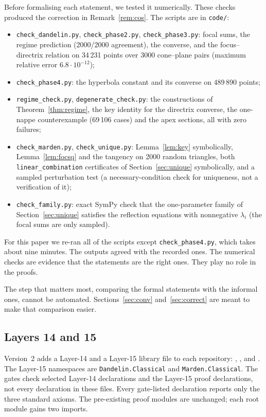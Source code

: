 \documentclass[11pt]{article}
\theoremstyle{remark}
\newcommand{\lean}[1]{\texttt{#1}}
\begin{document}
Before formalising each statement, we tested it numerically. These checks produced the correction in
Remark~\ref{rem:cos}. The scripts are in \texttt{code/}:
\begin{itemize}
\item \texttt{check\_dandelin.py}, \texttt{check\_phase2.py}, \texttt{check\_phase3.py}: focal sums,
the regime prediction (2000/2000 agreement), the converse, and the focus--directrix relation on 34\,231 points
over 3000 cone--plane pairs (maximum relative error $6.8\cdot10^{-12}$);
\item \texttt{check\_phase4.py}: the hyperbola constant and its converse on 489\,890 points;
\item \texttt{regime\_check.py}, \texttt{degenerate\_check.py}: the constructions of
Theorem~\ref{thm:regime}, the key identity for the directrix converse, the one-nappe counterexample
(69\,106 cases) and the apex sections, all with zero failures;
\item \texttt{check\_marden.py}, \texttt{check\_unique.py}: Lemma~\ref{lem:key} symbolically,
Lemma~\ref{lem:focsq} and the tangency on 2000 random triangles, both \lean{linear\_combination}
certificates of Section~\ref{sec:unique} symbolically, and a sampled perturbation test (a
necessary-condition check for uniqueness, not a verification of it);
\item \texttt{check\_family.py}: exact SymPy check that the one-parameter family of Section~\ref{sec:unique}
satisfies the reflection equations with nonnegative $\lambda_i$ (the focal sums are only sampled).
\end{itemize}
For this paper we re-ran all of the scripts except \texttt{check\_phase4.py}, which takes about nine minutes. The outputs agreed with the recorded
ones. The numerical checks are evidence that the statements are the right ones. They play no role in the proofs.

The step that matters most, comparing the formal statements with the informal ones, cannot be
automated. Sections~\ref{sec:conv} and~\ref{sec:correct} are meant to make that comparison easier.

\subsection{Layers 14 and 15}\label{sec:layers}
\begingroup\sloppy

Version~2 adds a Layer-14 and a Layer-15 library file to each repository:
, ,  and
. The Layer-15 namespaces are \lean{Dandelin.Classical} and
\lean{Marden.Classical}. The gates check selected Layer-14 declarations and the Layer-15 proof
declarations, not every declaration in these files. Every gate-listed declaration reports only the
three standard axioms. The pre-existing proof modules are unchanged; each root module gains two
imports.
\end{document}
